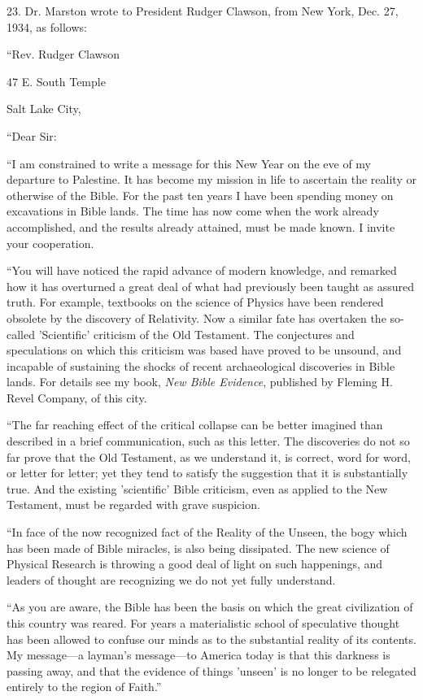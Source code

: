 23. Dr. Marston wrote to President Rudger Clawson, from New York, Dec. 27, 1934, as
follows:

``Rev. Rudger Clawson

47 E. South Temple

Salt Lake City,

``Dear Sir:

``I am constrained to write a message for this New Year on the eve of my departure to
Palestine. It has become my mission in life to ascertain the reality or otherwise of the Bible.
For the past ten years I have been spending money on excavations in Bible lands. The time
has now come when the work already accomplished, and the results already attained, must be
made known. I invite your cooperation.

``You will have noticed the rapid advance of modern knowledge, and remarked how it has
overturned a great deal of what had previously been taught as assured truth. For example,
textbooks on the science of Physics have been rendered obsolete by the discovery of
Relativity. Now a similar fate has overtaken the so-called 'Scientific' criticism of the Old
Testament. The conjectures and speculations on which this criticism was based have proved
to be unsound, and incapable of sustaining the shocks of recent archaeological discoveries in
Bible lands. For details see my book, \textit{New Bible Evidence}, published by Fleming H. Revel
Company, of this city.

``The far reaching effect of the critical collapse can be better imagined than described in a
brief communication, such as this letter. The discoveries do not so far prove that the Old
Testament, as we understand it, is correct, word for word, or letter for letter; yet they tend to
satisfy the suggestion that it is substantially true. And the existing 'scientific' Bible criticism,
even as applied to the New Testament, must be regarded with grave suspicion.

``In face of the now recognized fact of the Reality of the Unseen, the bogy which has been
made of Bible miracles, is also being dissipated. The new science of Physical Research is
throwing a good deal of light on such happenings, and leaders of thought are recognizing we
do not yet fully understand.

``As you are aware, the Bible has been the basis on which the great civilization of this country
was reared. For years a materialistic school of speculative thought has been allowed to
confuse our minds as to the substantial reality of its contents. My message—a layman's
message—to America today is that this darkness is passing away, and that the evidence of
things 'unseen' is no longer to be relegated entirely to the region of Faith.''

